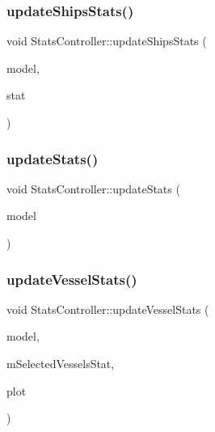 \subsubsection{\texorpdfstring{updateShipsStats()}{updateShipsStats()}}
{\footnotesize\ttfamily void Stats\+Controller\+::update\+Ships\+Stats (\begin{DoxyParamCaption}\item[{\mbox{\hyperlink{class_displace_model}{Displace\+Model}} $\ast$}]{model,  }\item[{\mbox{\hyperlink{namespacedisplace_1_1plot_a8c50b4d54cafba744b1b5b51b53407e0}{displace\+::plot\+::\+Ships\+Stat}}}]{stat }\end{DoxyParamCaption})\hspace{0.3cm}{\ttfamily [protected]}}

\mbox{\label{class_stats_controller_ae56ff943601c798965b524a886d1bc17}} 
\subsubsection{\texorpdfstring{updateStats()}{updateStats()}}
{\footnotesize\ttfamily void Stats\+Controller\+::update\+Stats (\begin{DoxyParamCaption}\item[{\mbox{\hyperlink{class_displace_model}{Displace\+Model}} $\ast$}]{model }\end{DoxyParamCaption})}

\mbox{\label{class_stats_controller_a0e5383657cec689a8e657a9115765c17}} 
\subsubsection{\texorpdfstring{updateVesselStats()}{updateVesselStats()}}
{\footnotesize\ttfamily void Stats\+Controller\+::update\+Vessel\+Stats (\begin{DoxyParamCaption}\item[{\mbox{\hyperlink{class_displace_model}{Displace\+Model}} $\ast$}]{model,  }\item[{\mbox{\hyperlink{namespacedisplace_1_1plot_aa453098d286017edd5b0ff3f15ba1013}{displace\+::plot\+::\+Vessels\+Stat}}}]{m\+Selected\+Vessels\+Stat,  }\item[{\mbox{\hyperlink{class_q_custom_plot}{Q\+Custom\+Plot}} $\ast$}]{plot }\end{DoxyParamCaption})\hspace{0.3cm}{\ttfamily [protected]}}


